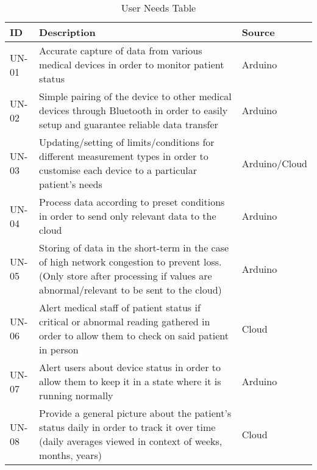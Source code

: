 \begin{landscape}
\thispagestyle{empty}
\begin{table}[H]
\centering
\caption{User Needs Table}
\begin{tabularx}{\linewidth}{|p{2.5cm}|X|p{2cm}|}
\hline 
\textbf{ID} & \textbf{Description } & \textbf{Source} \\
\hline
UN-01 & Accurate capture of data from various medical devices in order to monitor patient status & Arduino \\
\hline
UN-02 & Simple pairing of the device to other medical devices through Bluetooth in order to easily setup and guarantee reliable data transfer & Arduino \\
\hline
UN-03 & Updating/setting of limits/conditions for different measurement types in order to customise each device to a particular patient's needs & Arduino/\newline Cloud \\
\hline
UN-04 & Process data according to preset conditions in order to send only relevant data to the cloud & Arduino \\
\hline
UN-05 & Storing of data in the short-term in the case of high network congestion to prevent loss. (Only store after processing if values are abnormal/relevant to be sent to the cloud) & Arduino \\
\hline
UN-06 & Alert medical staff of patient status if critical or abnormal reading gathered in order to allow them to check on said patient in person & Cloud \\
\hline
UN-07 & Alert users about device status in order to allow them to keep it in a state where it is running normally & Arduino \\
\hline
UN-08 & Provide a general picture about the patient's status daily in order to track it over time (daily averages viewed in context of weeks, months, years) & Cloud \\
\hline
\end{tabularx}
\label{tab:user_needs_table}
\end{table}
\end{landscape}
